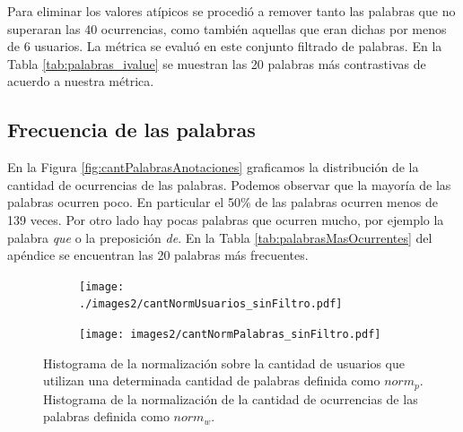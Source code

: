 Para eliminar los valores atípicos se procedió a remover tanto las palabras que no superaran las 40 ocurrencias, como también aquellas que eran dichas por menos de 6 usuarios. La métrica se evaluó en este conjunto filtrado de palabras. En la Tabla \ref{tab:palabras_ivalue} se muestran las 20 palabras más contrastivas de acuerdo a nuestra métrica.

\subsection{Frecuencia de las palabras}
\label{sub: frecuenciaPalabras}
En la Figura \ref{fig:cantPalabrasAnotaciones} graficamos la distribución de la cantidad de ocurrencias de las palabras. Podemos observar que la mayoría de las palabras ocurren poco. En particular el 50\% de las palabras ocurren menos de 139 veces. Por otro lado hay pocas palabras que ocurren mucho, por ejemplo la palabra \textit{que} o la preposición \textit{de}. En la Tabla \ref{tab:palabrasMasOcurrentes} del apéndice se encuentran las 20 palabras más frecuentes.


\begin{figure}[!ht]\centering
  \begin{subfigure}[t]{0.49\textwidth}
    \texttt{[image: ./images2/cantNormUsuarios\_sinFiltro.pdf]}
    \caption{} 
    \label{fig:cantNormUsuarios} 
   \end{subfigure}
   \begin{subfigure}[t]{0.49\textwidth}
    \texttt{[image: images2/cantNormPalabras\_sinFiltro.pdf]}
    \caption{} 
    \label{fig:cantNormPalabras} 
   \end{subfigure}
   \caption{ Histograma de la normalización sobre la cantidad de usuarios que utilizan una determinada cantidad de palabras definida como $norm_p$.  Histograma de la normalización de la cantidad de ocurrencias de las palabras definida como $norm_w$.}
   \label{fig:cantNormFig}
\end{figure}



